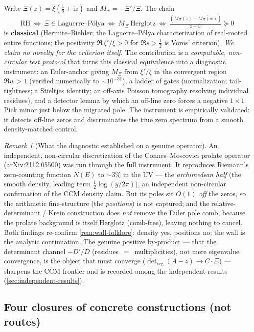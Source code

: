 \documentclass[12pt,a4paper]{article}
\theoremstyle{definition}
\theoremstyle{remark}
\newtheorem{remark}[theorem]{Remark}
\begin{document}
Write $\Xi(z)=\xi(\tfrac12+\mathrm{i}z)$ and $M_\Xi=-\Xi'/\Xi$. The chain
\[
\mathrm{RH}\ \Longleftrightarrow\ \Xi\in\text{Laguerre--P\'olya}
\ \Longleftrightarrow\ M_\Xi\ \text{Herglotz}
\ \Longleftrightarrow\ \tfrac{(M_\Xi(z)-\overline{M_\Xi(w)})}{z-\bar w}\succeq 0
\]
is \textbf{classical} (Hermite--Biehler; the Laguerre--P\'olya characterization of
real-rooted entire functions; the positivity $\Re\,\xi'/\xi>0$ for $\Re s>\tfrac12$
is Voros' criterion). \emph{We claim no novelty for the criterion itself.} The
contribution is a \emph{computable, non-circular test protocol} that turns this
classical equivalence into a diagnostic instrument: an Euler-anchor giving
$M_\Xi$ from $\xi'/\xi$ in the convergent region $\Re w>1$ (verified numerically to
$\sim 10^{-31}$), a ladder of gates (normalization; tail-tightness; a Stieltjes
identity; an off-axis Poisson tomography resolving individual residues), and a
detector lemma by which an off-line zero forces a negative $1\times1$ Pick minor
just below the migrated pole. The instrument is empirically validated: it detects
off-line zeros and discriminates the true zero spectrum from a smooth
density-matched control.

\begin{remark}[What the diagnostic established on a genuine operator]
An independent, non-circular discretization of the Connes--Moscovici prolate
operator (arXiv:2112.05500) was run through the full instrument. It reproduces
Riemann's zero-counting function $N(E)$ to $\sim 3\%$ in the UV --- the
\emph{archimedean half} (the smooth density, leading term $\tfrac12\log(y/2\pi)$),
an independent non-circular confirmation of the CCM density claim. But its poles
sit $O(1)$ \emph{off} the zeros, so the arithmetic fine-structure (the
\emph{positions}) is not captured; and the relative-determinant / Krein
construction does \emph{not} remove the Euler pole comb, because the prolate
background is itself Herglotz (comb-free), leaving nothing to cancel. Both findings
re-confirm \cref{rem:wall-folklore}: density yes, positions no; the wall is the
analytic continuation. The genuine positive by-product --- that the determinant
channel $-D'/D$ (residues~$=$~multiplicities), not mere eigenvalue convergence, is
the object that must converge ($\det_{\mathrm{reg}}(A-z)\to C\cdot\Xi$) --- sharpens
the CCM frontier and is recorded among the independent results
(\cref{sec:independent-results}).
\end{remark}

\subsection{Four closures of concrete constructions (not routes)}
\label{sec:four-closures}
\end{document}
